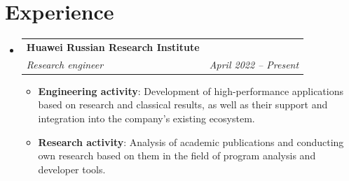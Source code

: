 \documentclass[a4paper,22pt]{article}
\makeatletter
\newcommand{\resumeItem}[2]{
  \item\small{
    \textbf{#1}{: #2 \vspace{-2pt}}
  }
}
\newcommand{\resumeSubheading}[4]{
  \vspace{-1pt}\item
    \begin{tabular*}{0.97\textwidth}{l@{\extracolsep{\fill}}r}
      \textbf{#1} & #2 \\
      \textit{#3} & \textit{#4} \\
    \end{tabular*}\vspace{-5pt}
}
\newcommand{\resumeSubHeadingListStart}{\begin{itemize}[leftmargin=*]}
\newcommand{\resumeSubHeadingListEnd}{\end{itemize}}
\newcommand{\resumeItemListStart}{\begin{itemize}}
\newcommand{\resumeItemListEnd}{\end{itemize}\vspace{-5pt}}
\makeatother
\begin{document}
\section{Experience}
  \resumeSubHeadingListStart
    \resumeSubheading{Huawei Russian Research Institute}{}
    {Research engineer}{April 2022 -- Present}
        \resumeItemListStart
        \resumeItem{Engineering activity}{Development of high-performance applications based on research and classical results, as well as their support and integration into the company's existing ecosystem.}
        \resumeItem{Research activity}{Analysis of academic publications and conducting own research based on them in the field of program analysis and developer tools.}
      \resumeItemListEnd
\resumeSubHeadingListEnd

\vspace{-5pt}
\end{document}
